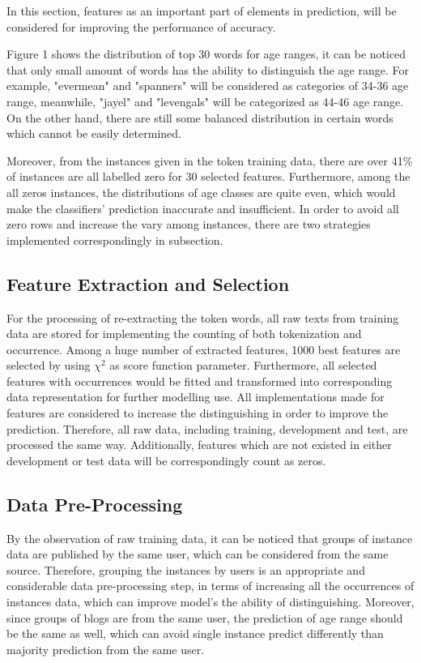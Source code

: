 \documentclass[11pt]{article}
\begin{document}
In this section, features as an important part of elements in prediction, will be considered for improving the performance of accuracy.

Figure 1 shows the distribution of top 30 words for age ranges, it can be noticed that only small amount of words has the ability to distinguish the age range. For example, "evermean" and "spanners" will be considered as categories of 34-36 age range, meanwhile, "jayel" and "levengals" will be categorized as 44-46 age range. On the other hand, there are still some balanced distribution in certain words which cannot be easily determined.

Moreover, from the instances given in the token training data, there are over 41\% of instances are all labelled zero for 30 selected features. Furthermore, among the all zeros instances, the distributions of age classes are quite even, which would make the classifiers' prediction inaccurate and insufficient.
In order to avoid all zero rows and increase the vary among instances, there are two strategies implemented correspondingly in subsection.

\subsection{Feature Extraction and Selection}
For the processing of re-extracting the token words, all raw texts from training data are stored for implementing the counting of both tokenization and occurrence. Among a huge number of extracted features, 1000 best features are selected by using $\chi^{2}$ as score function parameter. Furthermore, all selected features with occurrences would be fitted and transformed into corresponding data representation for further modelling use. All implementations made for features are considered to increase the distinguishing in order to improve the prediction. Therefore, all raw data, including training, development and test, are processed the same way. Additionally, features which are not existed in either development or test data will be correspondingly count as zeros.

\subsection{Data Pre-Processing}
By the observation of raw training data, it can be noticed that groups of instance data are published by the same user, which can be considered from the same source. Therefore, grouping the instances by users is an appropriate and considerable data pre-processing step, in terms of increasing all the occurrences of instances data, which can improve model’s the ability of distinguishing. Moreover, since groups of blogs are from the same user, the prediction of age range should be the same as well, which can avoid single instance predict differently than majority prediction from the same user.
\end{document}
